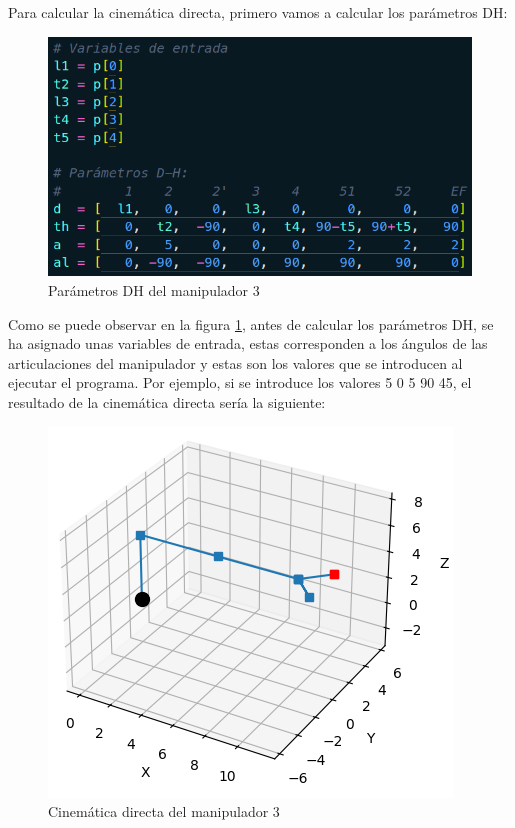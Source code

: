 \documentclass[11pt]{report}
\begin{document}
Para calcular la cinemática directa, primero vamos a calcular los parámetros DH:
\begin{figure}[H]
  \centering
  \includegraphics[scale=0.4]{img/parametros_dh.png}
  \caption{Parámetros DH del manipulador 3} 
  \label{fig:manipulador 3 dh}
\end{figure}

Como se puede observar en la figura \ref{fig:manipulador 3 dh}, antes de calcular los parámetros DH, se ha
asignado unas variables de entrada, estas corresponden a los ángulos de las articulaciones del manipulador
y estas son los valores que se introducen al ejecutar el programa. Por ejemplo, si se introduce los valores
5 0 5 90 45, el resultado de la cinemática directa sería la siguiente:
\begin{figure}[H]
  \centering
  \includegraphics[scale=0.6]{img/cinematica_directa.png}
  \caption{Cinemática directa del manipulador 3} 
  \label{fig:manipulador 3 cinematica directa}
\end{figure}
\end{document}
